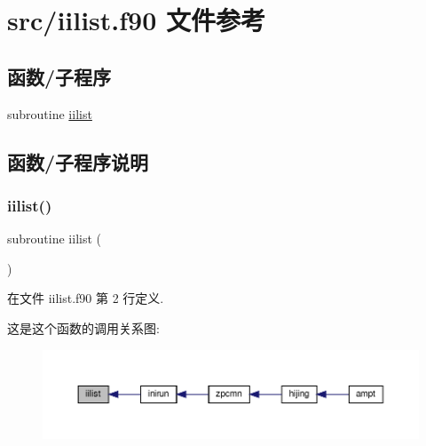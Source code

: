 \hypertarget{iilist_8f90}{}\section{src/iilist.f90 文件参考}
\label{iilist_8f90}
\subsection*{函数/子程序}
\begin{DoxyCompactItemize}
\item 
subroutine \mbox{\hyperlink{iilist_8f90_a252f877a19f20bc8836b33908a56c955}{iilist}}
\end{DoxyCompactItemize}


\subsection{函数/子程序说明}
\mbox{\label{iilist_8f90_a252f877a19f20bc8836b33908a56c955}} 
\subsubsection{\texorpdfstring{iilist()}{iilist()}}
{\footnotesize\ttfamily subroutine iilist (\begin{DoxyParamCaption}{ }\end{DoxyParamCaption})}



在文件 iilist.\+f90 第 2 行定义.

这是这个函数的调用关系图\+:
\nopagebreak
\begin{figure}[H]
\begin{center}
\leavevmode
\includegraphics[width=350pt]{iilist_8f90_a252f877a19f20bc8836b33908a56c955_icgraph}
\end{center}
\end{figure}
